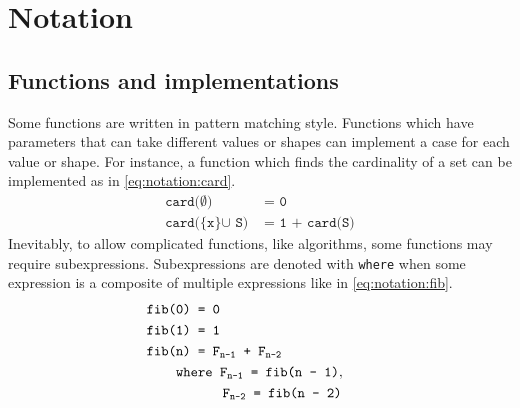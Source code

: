 \section{Notation}
\subsection{Functions and implementations}
Some functions are written in pattern matching style.
Functions which have parameters that can take different values or shapes can implement a case for each value or shape.
For instance, a function which finds the cardinality of a set can be implemented as in \autoref{eq:notation:card}.
\begin{align}
  \texttt{card($\emptyset$) }&\texttt{= 0} \label{eq:notation:card} \\
  \texttt{card(\{x\} $\cup$ S) }&\texttt{= 1 + card(S)} \tag*{}
\end{align}
Inevitably, to allow complicated functions, like algorithms, some functions may require subexpressions.
Subexpressions are denoted with \texttt{where} when some expression is a composite of multiple expressions like in \autoref{eq:notation:fib}.
\begin{align}
  \texttt{fib(0) }&\texttt{= 0} \label{eq:notation:fib} \\
  \texttt{fib(1) }&\texttt{= 1} \tag*{} \\
  \texttt{fib(n) }&\texttt{= F$_\texttt{n-1}$ + F$_\texttt{n-2}$} \tag*{} \\
  \texttt{whe}&\texttt{re F$_\texttt{n-1}$ = fib(n - 1)},\tag*{}\\
  &\hspace{0.62cm}\texttt{F$_\texttt{n-2}$ = fib(n - 2)}\tag*{}
\end{align}

